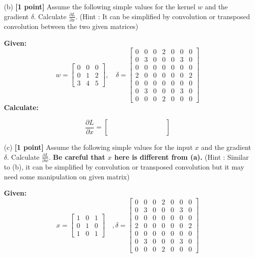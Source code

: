 \documentclass[11pt,english]{article}
\begin{document}
\begin{enumerate}[resume]
\vspace{1cm}

(b) \textbf{[1 point]} Assume the following simple values for the kernel $w$ and the gradient $\delta$. Calculate $\frac{\partial L}{\partial x}$. (Hint : It can be simplified by convolution or transposed convolution between the two given matrices)

\textbf{Given:}
\[
w = \begin{bmatrix} 
0 & 0 & 0 \\ 
0 & 1 & 2 \\ 
3 & 4 & 5 
\end{bmatrix}, \quad
\delta = \begin{bmatrix} 
0 & 0 & 0 & 2 & 0 & 0 & 0 \\
0 & 3 & 0 & 0 & 0 & 3 & 0 \\
0 & 0 & 0 & 0 & 0 & 0 & 0 \\
2 & 0 & 0 & 0 & 0 & 0 & 2 \\
0 & 0 & 0 & 0 & 0 & 0 & 0 \\
0 & 3 & 0 & 0 & 0 & 3 & 0 \\
0 & 0 & 0 & 2 & 0 & 0 & 0 
\end{bmatrix} 
\]
\textbf{Calculate:}

\[
\frac{\partial L}{\partial x} = 
\begin{bmatrix} 
\quad \quad & \quad \quad & \quad \quad \\ \\
\quad \quad & \quad \quad & \quad \quad \\ \\
\quad \quad & \quad \quad & \quad \quad 
\end{bmatrix}
\]
\vspace{1cm}


(c) \textbf{[1 point]} Assume the following simple values for the input $x$ and the gradient $\delta$. Calculate $\frac{\partial L}{\partial w}$. \textbf{Be careful that $x$ here is different from (a).} (Hint : Similar to (b), it can be simplified by convolution or transposed convolution but it may need some manipulation on given matrix)

\textbf{Given:}
\[
x = \begin{bmatrix} 
1 & 0 & 1 \\ 
0 & 1 & 0 \\ 
1 & 0 & 1 
\end{bmatrix} \quad , 
\delta = \begin{bmatrix} 
0 & 0 & 0 & 2 & 0 & 0 & 0 \\
0 & 3 & 0 & 0 & 0 & 3 & 0 \\
0 & 0 & 0 & 0 & 0 & 0 & 0 \\
2 & 0 & 0 & 0 & 0 & 0 & 2 \\
0 & 0 & 0 & 0 & 0 & 0 & 0 \\
0 & 3 & 0 & 0 & 0 & 3 & 0 \\
0 & 0 & 0 & 2 & 0 & 0 & 0 
\end{bmatrix} 
\]



\end{enumerate}
\end{document}
